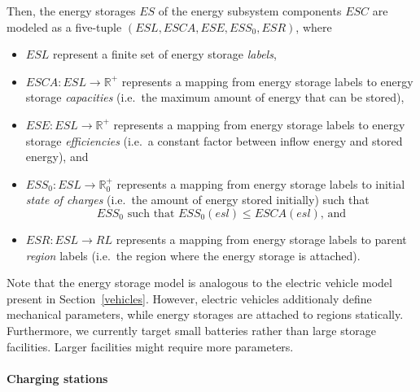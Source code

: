 Then, the energy storages $ES$ of the energy subsystem components $ESC$ are modeled as a five-tuple $(ESL, ESCA, ESE, ESS_0, ESR)$, where
\begin{itemize}
	\item $ESL$ represent a finite set of energy storage \textit{labels},
	\item $ESCA: ESL \rightarrow \mathbb{R}^+$ represents a mapping from energy storage labels to energy storage \textit{capacities} (i.e.\ the maximum amount of energy that can be stored),
	\item $ESE: ESL \rightarrow \mathbb{R}^+$ represents a mapping from energy storage labels to energy storage \textit{efficiencies} (i.e.\ a constant factor between inflow energy and stored energy), and
	\item $ESS_0: ESL \rightarrow \mathbb{R}_0^+$ represents a mapping from energy storage labels to initial \textit{state of charges} (i.e.\ the amount of energy stored initially) such that
	\[
		ESS_0 \textrm{ such that } ESS_0(esl) \leq ESCA(esl) \textrm{, and}
	\]
	\item $ESR: ESL \rightarrow RL$ represents a mapping from energy storage labels to parent \textit{region} labels (i.e.\ the region where the energy storage is attached).
\end{itemize}
Note that the energy storage model is analogous to the electric vehicle model present in Section~\ref{vehicles}. However, electric vehicles additionaly define mechanical parameters, while energy storages are attached to regions statically. Furthermore, we currently target small batteries rather than large storage facilities. Larger facilities might require more parameters.

\paragraph{Charging stations}
\label{charging_stations}

